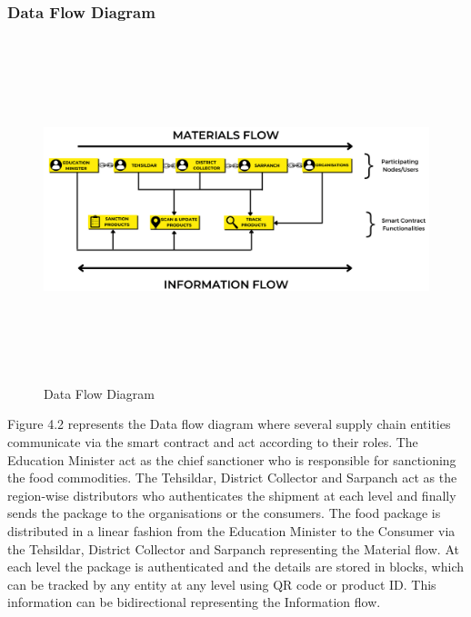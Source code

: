 \documentclass[12pt,a4paper,twocolumn,fleqn]{article}
\begin{document}
\subsubsection{Data Flow Diagram}
\begin{figure} [H]
\includegraphics[width=18cm,height=10cm]{media/Data_flow.png}
\centering
\caption{Data Flow Diagram}
\end{figure}
Figure 4.2 represents the Data flow diagram where several supply chain entities communicate via the smart contract and act according to their roles. The Education Minister act as the chief sanctioner who is responsible for sanctioning the food commodities. The Tehsildar, District Collector and Sarpanch act as the region-wise distributors who authenticates the shipment at each level and finally sends the package to the organisations or the consumers. The food package is distributed in a linear fashion from the Education Minister to the Consumer via the Tehsildar, District Collector and Sarpanch representing the Material flow. At each level the package is authenticated and the details are stored in blocks, which can be tracked by any entity at any level using QR code or product ID. This information can be bidirectional representing the Information flow.
\newpage
  \pagestyle{fancy}
  \thispagestyle{empty}
  \thispagestyle{plain}
  \fancyhf{}
  \chead{}
  \renewcommand{\headrulewidth}{0.4pt}%
\renewcommand{\footrulewidth}{0.4pt}%
\normalsize
\newpage
  \pagestyle{fancy}
  \thispagestyle{empty}
  \thispagestyle{plain}
  \fancyhf{}
  \chead{}
  \renewcommand{\headrulewidth}{0.4pt}%
\renewcommand{\footrulewidth}{0.4pt}%
\normalsize
\end{document}
